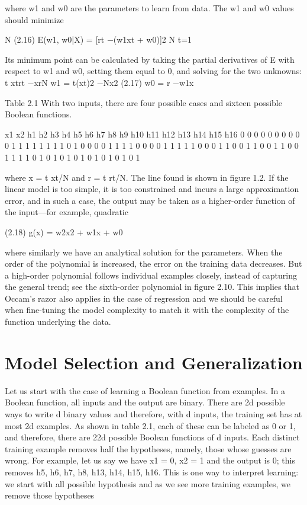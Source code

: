 where w1 and w0 are the parameters to learn from data. The w1 and w0 values should minimize

N (2.16) E(w1, w0|X) = [rt $-$(w1xt + w0)]2 N t=1

Its minimum point can be calculated by taking the partial derivatives of E with respect to w1 and w0, setting them equal to 0, and solving for the two unknowns: t xtrt $-$xrN w1 = t(xt)2 $-$Nx2 (2.17) w0 = r $-$w1x

Table 2.1 With two inputs, there are four possible cases and sixteen possible Boolean functions.

x1 x2 h1 h2 h3 h4 h5 h6 h7 h8 h9 h10 h11 h12 h13 h14 h15 h16 0 0 0 0 0 0 0 0 0 0 1 1 1 1 1 1 1 1 0 1 0 0 0 0 1 1 1 1 0 0 0 0 1 1 1 1 1 0 0 0 1 1 0 0 1 1 0 0 1 1 0 0 1 1 1 1 0 1 0 1 0 1 0 1 0 1 0 1 0 1 0 1

where x = t xt/N and r = t rt/N. The line found is shown in figure 1.2. If the linear model is too simple, it is too constrained and incurs a large approximation error, and in such a case, the output may be taken as a higher-order function of the input---for example, quadratic

(2.18) g(x) = w2x2 + w1x + w0

where similarly we have an analytical solution for the parameters. When the order of the polynomial is increased, the error on the training data decreases. But a high-order polynomial follows individual examples closely, instead of capturing the general trend; see the sixth-order polynomial in figure 2.10. This implies that Occam’s razor also applies in the case of regression and we should be careful when fine-tuning the model complexity to match it with the complexity of the function underlying the data.

\section{Model Selection and Generalization}

Let us start with the case of learning a Boolean function from examples. In a Boolean function, all inputs and the output are binary. There are 2d possible ways to write d binary values and therefore, with d inputs, the training set has at most 2d examples. As shown in table 2.1, each of these can be labeled as 0 or 1, and therefore, there are 22d possible Boolean functions of d inputs. Each distinct training example removes half the hypotheses, namely, those whose guesses are wrong. For example, let us say we have x1 = 0, x2 = 1 and the output is 0; this removes h5, h6, h7, h8, h13, h14, h15, h16. This is one way to interpret learning: we start with all possible hypothesis and as we see more training examples, we remove those hypotheses

